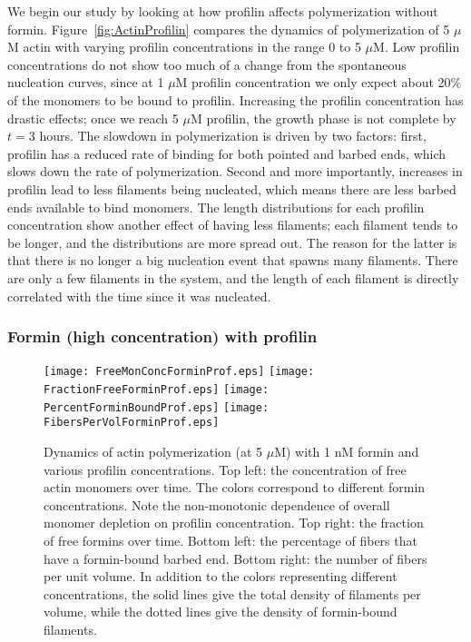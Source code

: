 \documentclass[11pt]{article}
\begin{document}
We begin our study by looking at how profilin affects polymerization without formin. Figure\ \ref{fig:ActinProfilin} compares the dynamics of polymerization of 5 $\mu$M actin with varying profilin concentrations in the range 0 to 5 $\mu$M. Low profilin concentrations do not show too much of a change from the spontaneous nucleation curves, since at 1 $\mu$M profilin concentration we only expect about 20\% of the monomers to be bound to profilin. Increasing the profilin concentration has drastic effects; once we reach 5 $\mu$M profilin, the growth phase is not complete by $t=3$ hours. The slowdown in polymerization is driven by two factors: first, profilin has a reduced rate of binding for both pointed and barbed ends, which slows down the rate of polymerization. Second and more importantly, increases in profilin lead to less filaments being nucleated, which means there are less barbed ends available to bind monomers. The length distributions for each profilin concentration show another effect of having less filaments; each filament tends to be longer, and the distributions are more spread out. The reason for the latter is that there is no longer a big nucleation event that spawns many filaments. There are only a few filaments in the system, and the length of each filament is directly correlated with the time since it was nucleated.

\subsubsection{Formin (high concentration) with profilin}
\begin{figure}
\centering
\texttt{[image: FreeMonConcForminProf.eps]}
\texttt{[image: FractionFreeForminProf.eps]}
\texttt{[image: PercentForminBoundProf.eps]}
\texttt{[image: FibersPerVolForminProf.eps]}
\caption{\label{fig:ActinForProf}Dynamics of actin polymerization (at 5 $\mu$M) with 1 nM formin and various profilin concentrations. Top left: the concentration of free actin monomers over time. The colors correspond to different formin concentrations. Note the non-monotonic dependence of overall monomer depletion on profilin concentration. Top right: the fraction of free formins over time. Bottom left: the percentage of fibers that have a formin-bound barbed end. Bottom right: the number of fibers per unit volume. In addition to the colors representing different concentrations, the solid lines give the total density of filaments per volume, while the dotted lines give the density of formin-bound filaments.}
\end{figure}
\end{document}
